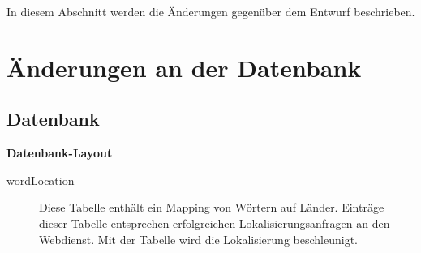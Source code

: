 In diesem Abschnitt werden die Änderungen gegenüber dem Entwurf beschrieben.

\section{Änderungen an der Datenbank}

\subsection{Datenbank}
	\textbf{Datenbank-Layout}
	\label{wordLocationTable}
	\begin{description}
		\item[wordLocation] Diese Tabelle enthält ein Mapping von Wörtern auf Länder. Einträge dieser Tabelle entsprechen erfolgreichen Lokalisierungsanfragen an den Webdienst. Mit der Tabelle wird die Lokalisierung  beschleunigt.
	\end{description}

